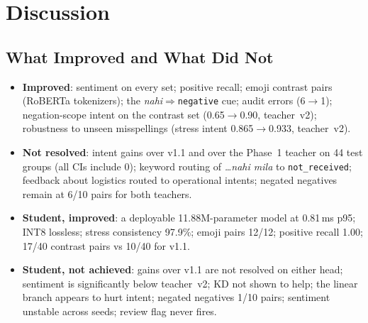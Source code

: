 \documentclass[11pt,a4paper]{article}
\theoremstyle{remark}
\newcommand{\lbl}[1]{\texttt{#1}}
\newcommand{\hi}[1]{\textit{#1}}
\begin{document}
\section{Discussion}
\label{sec:discussion}

\subsection{What Improved and What Did Not}
\begin{itemize}
  \item \textcolor{okgreen}{\textbf{Improved}}: sentiment on every set; positive recall; emoji contrast pairs (RoBERTa tokenizers); the \hi{nahi}$\Rightarrow$\lbl{negative} cue; audit errors (6$\to$1); negation-scope intent on the contrast set (0.65$\to$0.90, teacher~v2); robustness to unseen misspellings (stress intent 0.865$\to$0.933, teacher~v2).
  \item \textcolor{warn}{\textbf{Not resolved}}: intent gains over v1.1 and over the Phase~1 teacher on 44 test groups (all CIs include 0); keyword routing of \hi{\dots nahi mila} to \lbl{not\_received}; feedback about logistics routed to operational intents; negated negatives remain at 6/10 pairs for both teachers.
  \item \textcolor{okgreen}{\textbf{Student, improved}}: a deployable 11.88M-parameter model at 0.81\,ms p95; INT8 lossless; stress consistency 97.9\%; emoji pairs 12/12; positive recall 1.00; 17/40 contrast pairs vs 10/40 for v1.1.
  \item \textcolor{warn}{\textbf{Student, not achieved}}: gains over v1.1 are not resolved on either head; sentiment is significantly below teacher~v2; KD not shown to help; the linear branch appears to hurt intent; negated negatives 1/10 pairs; sentiment unstable across seeds; review flag never fires.
\end{itemize}
\end{document}
